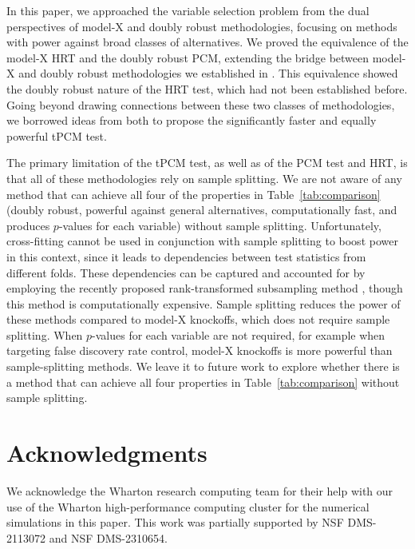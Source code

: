 \documentclass[12pt]{article}
\theoremstyle{definition}
\theoremstyle{remark}
\begin{document}
In this paper, we approached the variable selection problem from the dual perspectives of model-X and doubly robust methodologies, focusing on methods with power against broad classes of alternatives. We proved the equivalence of the model-X HRT and the doubly robust PCM, extending the bridge between model-X and doubly robust methodologies we established in \citet{Niu2022}. This equivalence showed the doubly robust nature of the HRT test, which had not been established before. Going beyond drawing connections between these two classes of methodologies, we borrowed ideas from both to propose the significantly faster and equally powerful tPCM test. 

The primary limitation of the tPCM test, as well as of the PCM test and HRT, is that all of these methodologies rely on sample splitting. We are not aware of any method that can achieve all four of the properties in Table~\ref{tab:comparison} (doubly robust, powerful against general alternatives, computationally fast, and produces $p$-values for each variable) without sample splitting. Unfortunately, cross-fitting cannot be used in conjunction with sample splitting to boost power in this context, since it leads to dependencies between test statistics from different folds. These dependencies can be captured and accounted for by employing the recently proposed rank-transformed subsampling method \citep{Guo2023}, though this method is computationally expensive. Sample splitting reduces the power of these methods compared to model-X knockoffs, which does not require sample splitting. When $p$-values for each variable are not required, for example when targeting false discovery rate control, model-X knockoffs is more powerful than sample-splitting methods. We leave it to future work to explore whether there is a method that can achieve all four properties in Table~\ref{tab:comparison} without sample splitting.

\section*{Acknowledgments}

We acknowledge the Wharton research computing team for their help with our use of the Wharton high-performance computing cluster for the numerical simulations in this paper. This work was partially supported by NSF DMS-2113072 and NSF DMS-2310654.


\printbibliography

\end{document}
